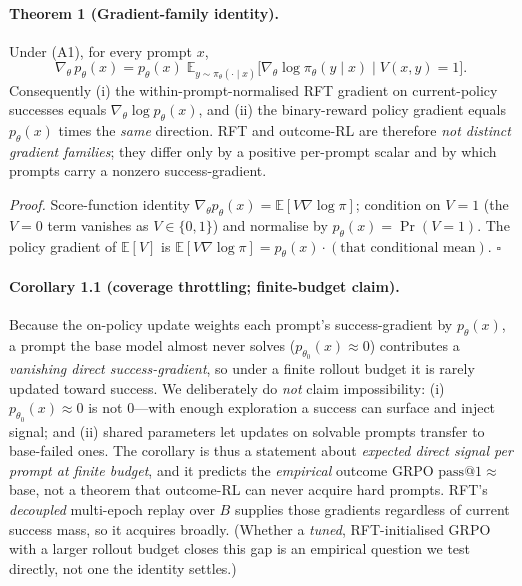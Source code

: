 \paragraph{Theorem 1 (Gradient-family identity).}
Under (A1), for every prompt $x$,
\begin{equation}
\nabla_\theta\,p_\theta(x)=p_\theta(x)\;
\mathbb{E}_{y\sim\pi_\theta(\cdot\mid x)}\!\big[\nabla_\theta\log\pi_\theta(y\mid x)\mid V(x,y)=1\big].
\label{eq:identity}
\end{equation}
Consequently (i) the within-prompt-normalised RFT gradient on current-policy
successes equals $\nabla_\theta\log p_\theta(x)$, and (ii) the binary-reward policy
gradient equals $p_\theta(x)$ times the \emph{same} direction. RFT and outcome-RL
are therefore \emph{not distinct gradient families}; they differ only by a positive
per-prompt scalar and by which prompts carry a nonzero success-gradient.

\emph{Proof.} Score-function identity $\nabla_\theta p_\theta(x)=\mathbb{E}[V\nabla\log\pi]$;
condition on $V=1$ (the $V=0$ term vanishes as $V\in\{0,1\}$) and normalise by
$p_\theta(x)=\Pr(V{=}1)$. The policy gradient of $\mathbb{E}[V]$ is
$\mathbb{E}[V\nabla\log\pi]=p_\theta(x)\cdot(\text{that conditional mean})$. $\square$

\paragraph{Corollary 1.1 (coverage throttling; finite-budget claim).}
Because the on-policy update weights each prompt's success-gradient by
$p_\theta(x)$, a prompt the base model almost never solves ($p_{\theta_0}(x)\!\approx\!0$)
contributes a \emph{vanishing direct success-gradient}, so under a finite rollout
budget it is rarely updated toward success. We deliberately do \emph{not} claim
impossibility: (i) $p_{\theta_0}(x)\!\approx\!0$ is not $0$---with enough
exploration a success can surface and inject signal; and (ii) shared parameters let
updates on solvable prompts transfer to base-failed ones. The corollary is thus a
statement about \emph{expected direct signal per prompt at finite budget}, and it
predicts the \emph{empirical} outcome GRPO $\text{pass}@1\!\approx\!$ base, not a
theorem that outcome-RL can never acquire hard prompts. RFT's \emph{decoupled}
multi-epoch replay over $B$ supplies those gradients regardless of current success
mass, so it acquires broadly. (Whether a \emph{tuned}, RFT-initialised GRPO with a
larger rollout budget closes this gap is an empirical question we test directly, not
one the identity settles.)

